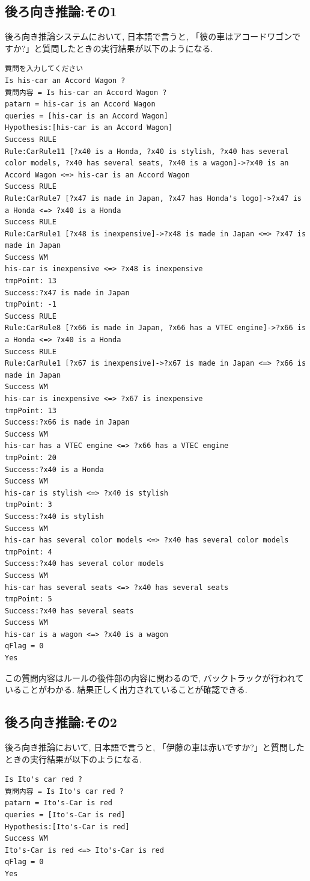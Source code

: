 \documentclass[uplatex,12pt]{jsarticle}
\begin{document}
\subsection{後ろ向き推論:その1}
後ろ向き推論システムにおいて, 日本語で言うと, 「彼の車はアコードワゴンですか?」と質問したときの実行結果が以下のようになる.
\begin{lstlisting}
質問を入力してください
Is his-car an Accord Wagon ?
質問内容 = Is his-car an Accord Wagon ?
patarn = his-car is an Accord Wagon
queries = [his-car is an Accord Wagon]
Hypothesis:[his-car is an Accord Wagon]
Success RULE
Rule:CarRule11 [?x40 is a Honda, ?x40 is stylish, ?x40 has several color models, ?x40 has several seats, ?x40 is a wagon]->?x40 is an Accord Wagon <=> his-car is an Accord Wagon
Success RULE
Rule:CarRule7 [?x47 is made in Japan, ?x47 has Honda's logo]->?x47 is a Honda <=> ?x40 is a Honda
Success RULE
Rule:CarRule1 [?x48 is inexpensive]->?x48 is made in Japan <=> ?x47 is made in Japan
Success WM
his-car is inexpensive <=> ?x48 is inexpensive
tmpPoint: 13
Success:?x47 is made in Japan
tmpPoint: -1
Success RULE
Rule:CarRule8 [?x66 is made in Japan, ?x66 has a VTEC engine]->?x66 is a Honda <=> ?x40 is a Honda
Success RULE
Rule:CarRule1 [?x67 is inexpensive]->?x67 is made in Japan <=> ?x66 is made in Japan
Success WM
his-car is inexpensive <=> ?x67 is inexpensive
tmpPoint: 13
Success:?x66 is made in Japan
Success WM
his-car has a VTEC engine <=> ?x66 has a VTEC engine
tmpPoint: 20
Success:?x40 is a Honda
Success WM
his-car is stylish <=> ?x40 is stylish
tmpPoint: 3
Success:?x40 is stylish
Success WM
his-car has several color models <=> ?x40 has several color models
tmpPoint: 4
Success:?x40 has several color models
Success WM
his-car has several seats <=> ?x40 has several seats
tmpPoint: 5
Success:?x40 has several seats
Success WM
his-car is a wagon <=> ?x40 is a wagon
qFlag = 0
Yes
\end{lstlisting}

この質問内容はルールの後件部の内容に関わるので, バックトラックが行われていることがわかる. 結果正しく出力されていることが確認できる.

\subsection{後ろ向き推論:その2}
後ろ向き推論において, 日本語で言うと, 「伊藤の車は赤いですか?」と質問したときの実行結果が以下のようになる.
\begin{lstlisting}
Is Ito's car red ?
質問内容 = Is Ito's car red ?
patarn = Ito's-Car is red
queries = [Ito's-Car is red]
Hypothesis:[Ito's-Car is red]
Success WM
Ito's-Car is red <=> Ito's-Car is red
qFlag = 0
Yes
\end{lstlisting}
\end{document}
